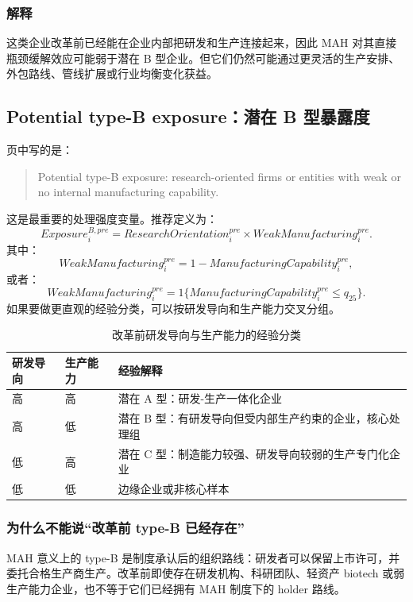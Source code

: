 \documentclass[12pt]{ctexart}
\begin{document}
\subsubsection*{解释}

这类企业改革前已经能在企业内部把研发和生产连接起来，因此 MAH 对其直接瓶颈缓解效应可能弱于潜在 B 型企业。但它们仍然可能通过更灵活的生产安排、外包路线、管线扩展或行业均衡变化获益。

\subsection{Potential type-B exposure：潜在 B 型暴露度}

页中写的是：
\begin{quote}
Potential type-B exposure: research-oriented firms or entities with weak or no internal manufacturing capability.
\end{quote}
这是最重要的处理强度变量。推荐定义为：
\[
\boxed{
Exposure_i^{B,pre}=ResearchOrientation_i^{pre}\times WeakManufacturing_i^{pre}.
}
\]
其中：
\[
WeakManufacturing_i^{pre}=1-ManufacturingCapability_i^{pre},
\]
或者：
\[
WeakManufacturing_i^{pre}=1\{ManufacturingCapability_i^{pre}\leq q_{25}\}.
\]
如果要做更直观的经验分类，可以按研发导向和生产能力交叉分组。

\begin{table}[h!]
\centering
\caption{改革前研发导向与生产能力的经验分类}
\begin{tabularx}{\textwidth}{L{0.18\textwidth}L{0.18\textwidth}Y}
\toprule
研发导向 & 生产能力 & 经验解释 \\
\midrule
高 & 高 & 潜在 A 型：研发-生产一体化企业 \\
高 & 低 & 潜在 B 型：有研发导向但受内部生产约束的企业，核心处理组 \\
低 & 高 & 潜在 C 型：制造能力较强、研发导向较弱的生产专门化企业 \\
低 & 低 & 边缘企业或非核心样本 \\
\bottomrule
\end{tabularx}
\end{table}

\subsubsection*{为什么不能说“改革前 type-B 已经存在”}

MAH 意义上的 type-B 是制度承认后的组织路线：研发者可以保留上市许可，并委托合格生产商生产。改革前即使存在研发机构、科研团队、轻资产 biotech 或弱生产能力企业，也不等于它们已经拥有 MAH 制度下的 holder 路线。
\end{document}
